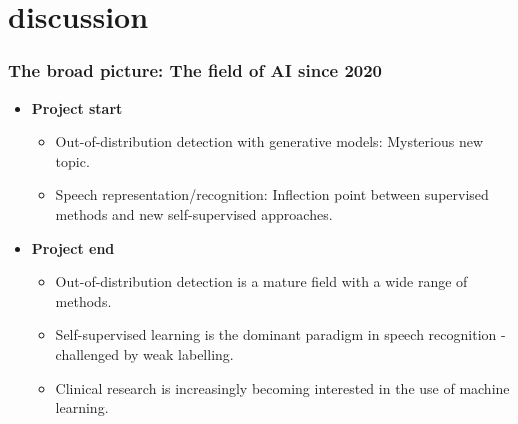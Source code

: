 
\section{discussion}






\begin{frame}
    \frametitle{The broad picture: The field of AI since 2020}
    \begin{itemize}
        \item <1-> [2020] \textbf{Project start}
        \begin{itemize} 
            \item <1-> Out-of-distribution detection with generative models: Mysterious new topic.
            \item <1-> Speech representation/recognition: Inflection point between supervised methods and new self-supervised approaches.
        \end{itemize}
        \item <2-> [2024] \textbf{Project end}
        \begin{itemize}
            \item <2-> Out-of-distribution detection is a mature field with a wide range of methods.
            \item <2-> Self-supervised learning is the dominant paradigm in speech recognition - challenged by weak labelling.
            \item <3-> Clinical research is increasingly becoming interested in the use of machine learning.
        \end{itemize}
    \end{itemize}
\end{frame}


